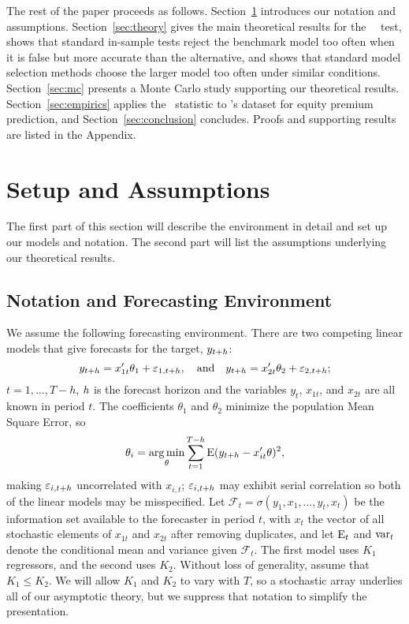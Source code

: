 \documentclass[11pt]{article}
\newcommand{\e}{\varepsilon}
\newcommand{\citepos}[1]{\citeauthor{#1}'s \citeyearpar{#1}}
\begin{document}
The rest of the paper proceeds as follows.
Section~\ref{sec:assumptions} introduces our notation and assumptions.
Section~\ref{sec:theory} gives the main theoretical results for the
\dmw\ \oos\ test, shows that standard in-sample tests reject the
benchmark model too often when it is false but more accurate than the
alternative, and shows that standard model selection methods choose the
larger model too often under similar conditions. Section~\ref{sec:mc}
presents a Monte Carlo study supporting our theoretical results.
Section~\ref{sec:empirics} applies the \oos\ statistic to
\citepos{GoW:08} dataset for equity premium prediction, and
Section~\ref{sec:conclusion} concludes.  Proofs and supporting results
are listed in the Appendix.

\section{Setup and Assumptions}\label{sec:assumptions}
The first part of this section will describe the environment in detail
and set up our models and notation. The second part will list the
assumptions underlying our theoretical results.

\subsection{Notation and Forecasting Environment}
We assume the following forecasting environment. There are two
competing linear models that give forecasts for the target,
$y_{t+h}$:
\[
y_{t+\h} = x_{1t}'\theta_1 + \e_{1,t+h}, \quad\text{and}\quad
y_{t+\h} = x_{2t}'\theta_2 + \e_{2,t+h};
\]
$t = 1,\dots,T-h$, $h$ is the forecast horizon and the
variables $y_t$, $x_{1t}$, and $x_{2t}$ are all known in period $t$.
The coefficients $\theta_1$ and $\theta_2$ minimize the population
Mean Square Error, so
\begin{equation*}
  \theta_i = \operatorname*{arg\,min}_\theta \sum_{t=1}^{T-h} \operatorname{E} (y_{t+h} - x_{it}'\theta)^2,
\end{equation*}
making $\e_{i,t+\h}$ uncorrelated with $x_{i,t}$; $\e_{i,t+\h}$ may exhibit
serial correlation so both of the linear models may be misspecified.
Let $\mathcal{F}_t = \sigma(y_1, x_1, \dots, y_t, x_t)$ be the information
set available to the forecaster in period $t$,
with $x_t$ the vector of all stochastic elements of $x_{1t}$ and $x_{2t}$ after
removing duplicates, and let $\operatorname{E}_t$ and $\operatorname{var}_t$ denote the
conditional mean and variance given $\mathcal{F}_t$.  The first model
uses $K_1$ regressors, and the second uses $K_2$.  Without loss of
generality, assume that $K_1 \leq K_2$.  We will allow $K_1$ and $K_2$
to vary with $T$, so a stochastic array underlies all of our
asymptotic theory, but we suppress that notation to simplify the
presentation.
\end{document}
